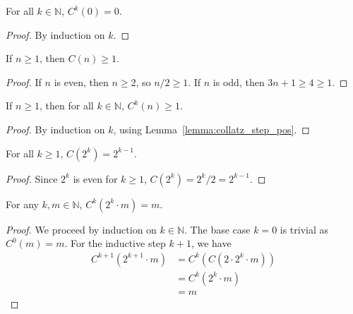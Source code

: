\begin{lemma}\label{lemma:collatz_iter_zero}\leanok
For all $k \in \mathbb{N}$, $C^k(0) = 0$.
\end{lemma}
\begin{proof}\leanok
By induction on $k$.
\end{proof}

\begin{lemma}\label{lemma:collatz_step_pos}\leanok
If $n \ge 1$, then $C(n) \ge 1$.
\end{lemma}
\begin{proof}\leanok
If $n$ is even, then $n \ge 2$, so $n/2 \ge 1$. If $n$ is odd, then $3n+1 \ge 4 \ge 1$.
\end{proof}

\begin{lemma}\label{lemma:collatz_iter_pos}\leanok
If $n \ge 1$, then for all $k \in \mathbb{N}$, $C^k(n) \ge 1$.
\end{lemma}
\begin{proof}\leanok
By induction on $k$, using Lemma~\ref{lemma:collatz_step_pos}.
\end{proof}

\begin{lemma}\label{lemma:collatz_step_pow_two}\leanok
For all $k \ge 1$, $C(2^k) = 2^{k-1}$.
\end{lemma}
\begin{proof}\leanok
Since $2^k$ is even for $k \ge 1$, $C(2^k) = 2^k/2 = 2^{k-1}$.
\end{proof}

\begin{lemma}\label{lemma:collatz_iter_two_pow_mul}\leanok
For any $k, m \in \mathbb{N}$, $C^k(2^k \cdot m) = m$.
\end{lemma}
\begin{proof}\leanok
We proceed by induction on $k \in \mathbb{N}$. The base case $k=0$ is trivial as $C^0(m) = m$.
For the inductive step $k+1$, we have
\begin{align*}
    C^{k+1}(2^{k+1} \cdot m) &= C^k(C(2 \cdot 2^k \cdot m)) \\
    &= C^k(2^k \cdot m) \tag{since $2 \cdot 2^k \cdot m$ is even} \\
    &= m \tag{by induction hypothesis.}
\end{align*}
\end{proof}

